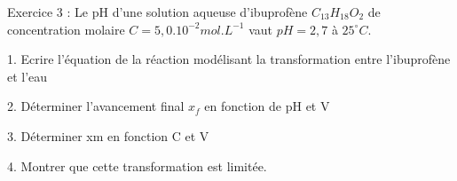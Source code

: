 \documentclass[12pt, french]{article}
\begin{document}
\begin{Box2}{Exercice 3 : }
	Le pH d’une solution aqueuse d’ibuprofène $C_{13}H_{18}O_2$ de concentration molaire $C = 5,0.10^{-2} mol.L^{-1}$ vaut $pH = 2,7$
	à $25^{\circ}C$.

1. Ecrire l'équation de la réaction modélisant la transformation entre l’ibuprofène et l'eau

2. Déterminer l’avancement final $x_f$ en fonction de pH et V

3. Déterminer xm en fonction C et V

4. Montrer que cette transformation est limitée.


\end{Box2}
\end{document}

